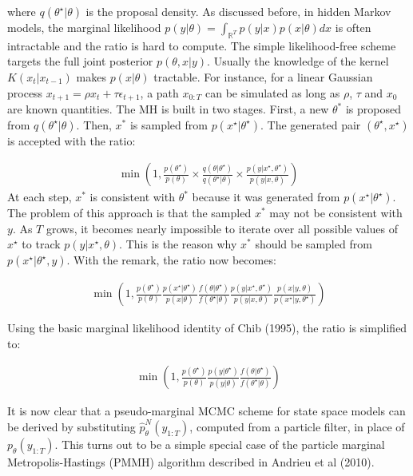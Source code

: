 \documentclass[11pt,a4,twosided,singlespacing,titlepagenumber=on]{scrreprt}
\numberwithin{equation}{chapter} %
\theoremstyle{remark}
\begin{document}
where $q(\theta^\star|\theta)$ is the proposal density. As discussed before, in hidden Markov models, the marginal likelihood $p(y|\theta) = \int_{\mathbb{R}^T} p(y|x)p(x|\theta) dx$ is often intractable and the ratio is hard to compute. The simple likelihood-free scheme targets the full joint posterior $p(\theta,x|y)$. Usually the knowledge of the kernel $K(x_t|x_{t-1})$ makes $p(x|\theta)$ tractable. For instance, for a linear Gaussian process $x_{t+1} = \rho x_t + \tau \epsilon_{t+1}$, a path $x_{0:T}$ can be simulated as long as $\rho$, $\tau$ and $x_0$ are known quantities. The MH is built in two stages. First, a new $\theta^*$ is proposed from $q(\theta^\star|\theta)$. Then, $x^*$ is sampled from $p(x^\star|\theta^\star)$. The generated pair $(\theta^\star,x^\star)$ is accepted with the ratio:

\begin{align*}
\min \left( 1, \frac{p(\theta^\star)}{p(\theta)} \times  \frac{q(\theta|\theta^\star)}{q(\theta^\star|\theta)} \times \frac{p(y|{x}^\star,\theta^\star)}{p(y|{x},\theta)} \right)
\end{align*}
At each step, $x^*$ is consistent with $\theta^*$ because it was generated from $p(x^\star|\theta^\star)$. The problem of this approach is that the sampled $x^*$ may not be consistent with $y$. As $T$ grows, it becomes nearly impossible to iterate over all possible values of $x^\star$ to track $p(y|x^\star,\theta)$. This is the reason why $x^*$ should be sampled from $p(x^\star|\theta^\star,y)$. With the remark, the ratio now becomes:

\begin{align*}
 \min \left(1, \frac{p(\theta^\star)}{p(\theta)}   \frac{p({x}^\star|\theta^\star)}{p({x}|\theta)}   \frac{f(\theta|\theta^\star)}{f(\theta^\star|\theta)}   \frac{p(y|{x}^\star,\theta^\star)}{p(y|{x},\theta)}  \frac{p({x}|y,\theta)}{p({x}^\star|y,\theta^\star)} \right)
\end{align*}

Using the basic marginal likelihood identity of Chib (1995), the ratio is simplified to:

\begin{align*}
 \min \left(1, \frac{p(\theta^\star)}{p(\theta)}  \frac{p(y|\theta^\star)}{p(y|\theta)} \frac{f(\theta|\theta^\star)}{f(\theta^\star|\theta)} \right)
\end{align*}

It is now clear that a pseudo-marginal MCMC scheme for state space models can be derived by substituting $\hat{p}^N_{\theta}(y_{1:T})$, computed from a particle filter, in place of $p_{\theta}(y_{1:T})$. This turns out to be a simple special case of the particle marginal Metropolis-Hastings (PMMH) algorithm described in Andrieu et al (2010).
\end{document}

